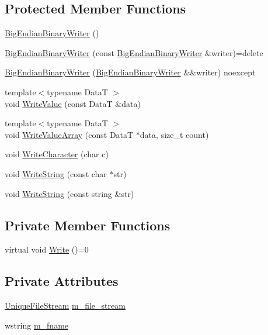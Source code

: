 \subsection*{Protected Member Functions}
\begin{DoxyCompactItemize}
\item 
\hyperlink{classmage_1_1_big_endian_binary_writer_ac0917b684913834577d4850269a6c09a}{Big\+Endian\+Binary\+Writer} ()
\item 
\hyperlink{classmage_1_1_big_endian_binary_writer_aafe65752342b2740e7293878ae469d9f}{Big\+Endian\+Binary\+Writer} (const \hyperlink{classmage_1_1_big_endian_binary_writer}{Big\+Endian\+Binary\+Writer} \&writer)=delete
\item 
\hyperlink{classmage_1_1_big_endian_binary_writer_aaf2dcf536afefc7b0ca8b0752024311d}{Big\+Endian\+Binary\+Writer} (\hyperlink{classmage_1_1_big_endian_binary_writer}{Big\+Endian\+Binary\+Writer} \&\&writer) noexcept
\item 
{\footnotesize template$<$typename DataT $>$ }\\void \hyperlink{classmage_1_1_big_endian_binary_writer_a30edcc0ad823fc8b4f8c51107f11405a}{Write\+Value} (const DataT \&data)
\item 
{\footnotesize template$<$typename DataT $>$ }\\void \hyperlink{classmage_1_1_big_endian_binary_writer_a70459f96b5389052d6e090e124c5468b}{Write\+Value\+Array} (const DataT $\ast$data, size\+\_\+t count)
\item 
void \hyperlink{classmage_1_1_big_endian_binary_writer_a869eff3f6e0666406bd5470af3e02096}{Write\+Character} (char c)
\item 
void \hyperlink{classmage_1_1_big_endian_binary_writer_a1a62be10de26eb77e1812e6807eb4c02}{Write\+String} (const char $\ast$str)
\item 
void \hyperlink{classmage_1_1_big_endian_binary_writer_a0cbee156086deb8999e609a2b355ff0e}{Write\+String} (const string \&str)
\end{DoxyCompactItemize}
\subsection*{Private Member Functions}
\begin{DoxyCompactItemize}
\item 
virtual void \hyperlink{classmage_1_1_big_endian_binary_writer_ae6ee6613e629971502324cffc944795d}{Write} ()=0
\end{DoxyCompactItemize}
\subsection*{Private Attributes}
\begin{DoxyCompactItemize}
\item 
\hyperlink{namespacemage_a0ee1bd45ad7dbb3dc8c8e1770e3538d4}{Unique\+File\+Stream} \hyperlink{classmage_1_1_big_endian_binary_writer_ad2cdbdca429d6c351a57b51d175ffb55}{m\+\_\+file\+\_\+stream}
\item 
wstring \hyperlink{classmage_1_1_big_endian_binary_writer_a5bf83b685bfce080f55458bdca2e698a}{m\+\_\+fname}
\end{DoxyCompactItemize}


